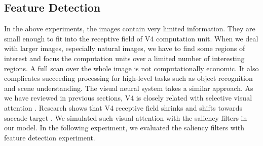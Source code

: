 \documentclass[conference]{IEEEtran}
\begin{document}
\subsection{Feature Detection}

In the above experiments, the images contain very limited information.
They are small enough to fit into the receptive field of V4 computation unit.
When we deal with larger images, especially natural images,
we have to find some regions of interest 
and focus the computation units over a limited number of interesting regions.
A full scan over the whole image is not computationally economic.
It also complicates succeeding processing for high-level tasks 
such as object recognition and scene understanding.
The visual neural system takes a similar approach.
As we have reviewed in previous sections, 
V4 is closely related with selective visual attention \cite{roe2012}.
Research shows that V4 receptive field shrinks and shifts towards saccade target \cite{hamker2006}.
We simulated such visual attention with the saliency filters in our model.
In the following experiment,
we evaluated the saliency filters with feature detection experiment.
\end{document}
